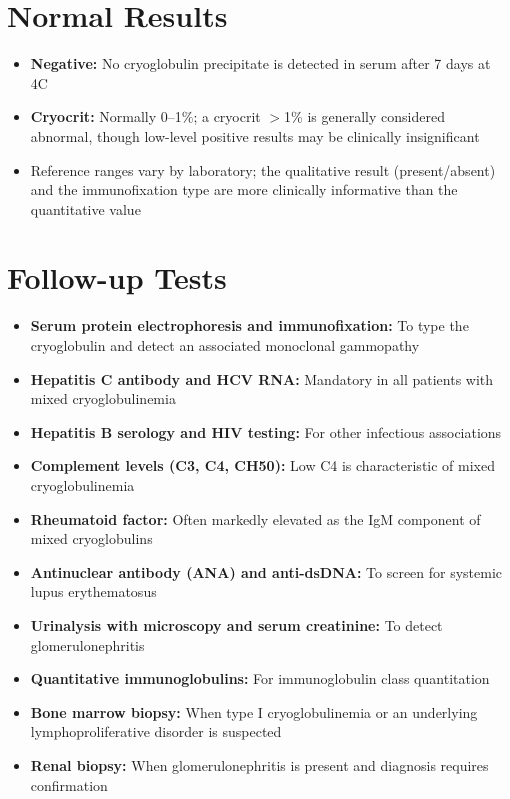 \section*{Normal Results}
\begin{itemize}
  \item \textbf{Negative:} No cryoglobulin precipitate is detected in serum after 7 days at 4\textdegree{}C
  \item \textbf{Cryocrit:} Normally 0--1\%; a cryocrit $>$1\% is generally considered abnormal, though low-level positive results may be clinically insignificant
  \item Reference ranges vary by laboratory; the qualitative result (present/absent) and the immunofixation type are more clinically informative than the quantitative value
\end{itemize}

\section*{Follow-up Tests}
\begin{itemize}
  \item \textbf{Serum protein electrophoresis and immunofixation:} To type the cryoglobulin and detect an associated monoclonal gammopathy
  \item \textbf{Hepatitis C antibody and HCV RNA:} Mandatory in all patients with mixed cryoglobulinemia
  \item \textbf{Hepatitis B serology and HIV testing:} For other infectious associations
  \item \textbf{Complement levels (C3, C4, CH50):} Low C4 is characteristic of mixed cryoglobulinemia
  \item \textbf{Rheumatoid factor:} Often markedly elevated as the IgM component of mixed cryoglobulins
  \item \textbf{Antinuclear antibody (ANA) and anti-dsDNA:} To screen for systemic lupus erythematosus
  \item \textbf{Urinalysis with microscopy and serum creatinine:} To detect glomerulonephritis
  \item \textbf{Quantitative immunoglobulins:} For immunoglobulin class quantitation
  \item \textbf{Bone marrow biopsy:} When type I cryoglobulinemia or an underlying lymphoproliferative disorder is suspected
  \item \textbf{Renal biopsy:} When glomerulonephritis is present and diagnosis requires confirmation
\end{itemize}


